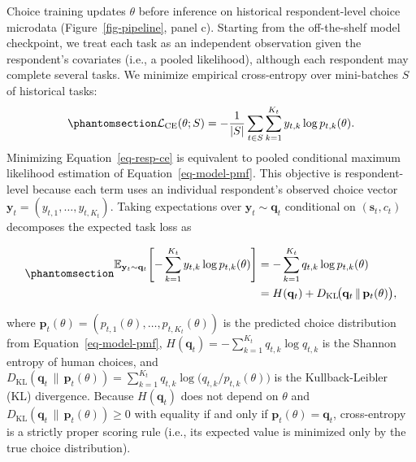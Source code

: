 \documentclass[
  11pt,
  letterpaper,
]{article}
\begin{document}
Choice training updates \(\theta\) before inference on historical
respondent-level choice microdata (Figure~\ref{fig-pipeline}, panel c).
Starting from the off-the-shelf model checkpoint, we treat each task as
an independent observation given the respondent's covariates (i.e., a
pooled likelihood), although each respondent may complete several tasks.
We minimize empirical cross-entropy over mini-batches \(S\) of
historical tasks:
\begin{equation}\protect\phantomsection\label{eq-resp-ce}{
\mathcal{L}_{\mathrm{CE}}(\theta; S) = -\frac{1}{|S|} \sum_{t \in S} \sum_{k=1}^{K_t} y_{t,k} \log p_{t,k}(\theta).
}\end{equation} Minimizing Equation~\ref{eq-resp-ce} is equivalent to
pooled conditional maximum likelihood estimation of
Equation~\ref{eq-model-pmf}. This objective is respondent-level because
each term uses an individual respondent's observed choice vector
\(\mathbf{y}_t = (y_{t,1}, \dots, y_{t,K_t})\). Taking expectations over
\(\mathbf{y}_t \sim \mathbf{q}_t\) conditional on
\((\mathbf{s}_t, c_t)\) decomposes the expected task loss as

\begin{equation}\protect\phantomsection\label{eq-ce-kl}{
\begin{aligned}
\mathbb{E}_{\mathbf{y}_t \sim \mathbf{q}_t}\!\left[-\sum_{k=1}^{K_t} y_{t,k} \log p_{t,k}(\theta)\right]
&= -\sum_{k=1}^{K_t} q_{t,k} \log p_{t,k}(\theta) \\
&= H(\mathbf{q}_t) + D_{\mathrm{KL}}\!\big(\mathbf{q}_t \,\|\, \mathbf{p}_t(\theta)\big),
\end{aligned}
}\end{equation}

where
\(\mathbf{p}_t(\theta) = (p_{t,1}(\theta), \dots, p_{t,K_t}(\theta))\)
is the predicted choice distribution from Equation~\ref{eq-model-pmf},
\(H(\mathbf{q}_t) = -\sum_{k=1}^{K_t} q_{t,k} \log q_{t,k}\) is the
Shannon entropy of human choices, and
\(D_{\mathrm{KL}}(\mathbf{q}_t \,\|\, \mathbf{p}_t(\theta)) = \sum_{k=1}^{K_t} q_{t,k} \log\big(q_{t,k} / p_{t,k}(\theta)\big)\)
is the Kullback-Leibler (KL) divergence. Because \(H(\mathbf{q}_t)\)
does not depend on \(\theta\) and
\(D_{\mathrm{KL}}(\mathbf{q}_t \,\|\, \mathbf{p}_t(\theta)) \ge 0\) with
equality if and only if \(\mathbf{p}_t(\theta) = \mathbf{q}_t\),
cross-entropy is a strictly proper scoring rule (i.e., its expected
value is minimized only by the true choice distribution).
\end{document}
